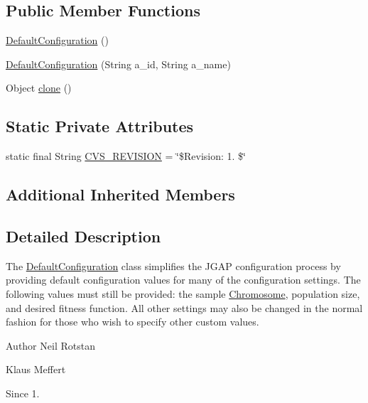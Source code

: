 \subsection*{Public Member Functions}
\begin{DoxyCompactItemize}
\item 
\hyperlink{classorg_1_1jgap_1_1impl_1_1_default_configuration_ac0f92416491cff7ddec0de043b81507d}{Default\-Configuration} ()
\item 
\hyperlink{classorg_1_1jgap_1_1impl_1_1_default_configuration_a94e1a46c78854ca700769acc748f6e65}{Default\-Configuration} (String a\-\_\-id, String a\-\_\-name)
\item 
Object \hyperlink{classorg_1_1jgap_1_1impl_1_1_default_configuration_ad21431365616ca72116f564c9ab70cb9}{clone} ()
\end{DoxyCompactItemize}
\subsection*{Static Private Attributes}
\begin{DoxyCompactItemize}
\item 
static final String \hyperlink{classorg_1_1jgap_1_1impl_1_1_default_configuration_af3f9cc94aa0ebadcebdf5be706a91b25}{C\-V\-S\-\_\-\-R\-E\-V\-I\-S\-I\-O\-N} = \char`\"{}\$Revision\-: 1. \$\char`\"{}
\end{DoxyCompactItemize}
\subsection*{Additional Inherited Members}


\subsection{Detailed Description}
The \hyperlink{classorg_1_1jgap_1_1impl_1_1_default_configuration}{Default\-Configuration} class simplifies the J\-G\-A\-P configuration process by providing default configuration values for many of the configuration settings. The following values must still be provided\-: the sample \hyperlink{classorg_1_1jgap_1_1_chromosome}{Chromosome}, population size, and desired fitness function. All other settings may also be changed in the normal fashion for those who wish to specify other custom values.

\begin{DoxyAuthor}{Author}
Neil Rotstan 

Klaus Meffert 
\end{DoxyAuthor}
\begin{DoxySince}{Since}
1. 
\end{DoxySince}



